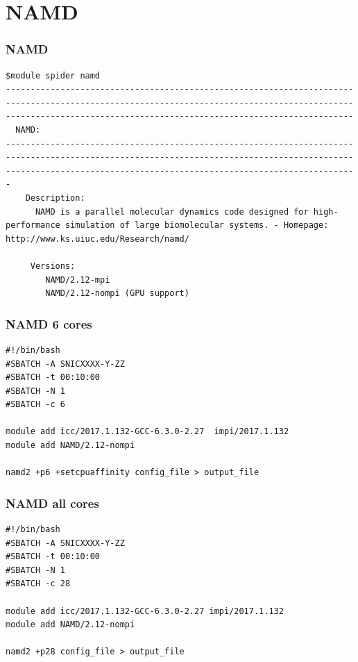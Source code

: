 \section{NAMD}


\begin{frame}[fragile]
	\frametitle{NAMD}
{\small 
        \begin{verbatim}             
$module spider namd
------------------------------------------------------------------------------------------------------------------------------------------------------------------------------------------------------------------
  NAMD:
-------------------------------------------------------------------------------------------------------------------------------------------------------------------------------------------------------------------
    Description:
      NAMD is a parallel molecular dynamics code designed for high-performance simulation of large biomolecular systems. - Homepage: http://www.ks.uiuc.edu/Research/namd/ 

     Versions:
        NAMD/2.12-mpi
        NAMD/2.12-nompi (GPU support)
        \end{verbatim}
}
\end{frame}

\begin{frame}[fragile]
	\frametitle{NAMD 6 cores}
  
        \begin{verbatim}             
#!/bin/bash
#SBATCH -A SNICXXXX-Y-ZZ
#SBATCH -t 00:10:00
#SBATCH -N 1
#SBATCH -c 6

module add icc/2017.1.132-GCC-6.3.0-2.27  impi/2017.1.132
module add NAMD/2.12-nompi

namd2 +p6 +setcpuaffinity config_file > output_file
        \end{verbatim}

\end{frame}

\begin{frame}[fragile]
	\frametitle{NAMD all cores}
  
        \begin{verbatim}             
#!/bin/bash
#SBATCH -A SNICXXXX-Y-ZZ
#SBATCH -t 00:10:00
#SBATCH -N 1
#SBATCH -c 28

module add icc/2017.1.132-GCC-6.3.0-2.27 impi/2017.1.132
module add NAMD/2.12-nompi

namd2 +p28 config_file > output_file
        \end{verbatim}

\end{frame}


